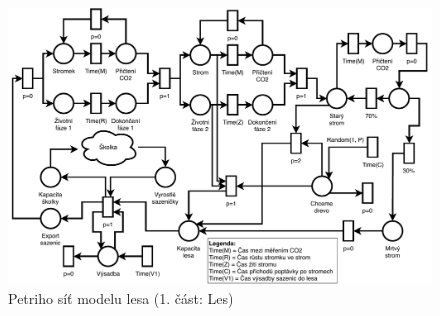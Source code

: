 \documentclass[a4paper, 11pt, titlepage]{article}
\begin{document}
\begin{landscape}
\begin{figure}[!ht]
    \centering
    \includegraphics[scale=0.85]{assets/pn_les_v2.pdf}
    \caption{Petriho síť modelu lesa (1. část: Les)}
    \label{fig:pn_forest}
\end{figure}
\end{landscape}
\end{document}
